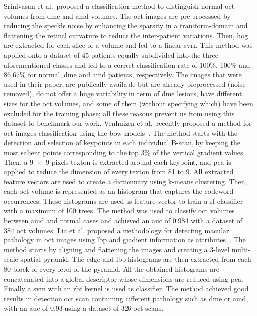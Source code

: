 Srinivasan et al.\,\cite{srinivasan2014fully} proposed a classification method to distinguish normal \gls{oct} volumes from \gls{dme} and \gls{amd} volumes.
The \gls{oct} images are pre-processed by reducing the speckle noise by enhancing the sparsity in a transform-domain and flattening the retinal curvature to reduce the inter-patient variations.
Then, \gls{hog} are extracted for each slice of a volume and fed to a linear \gls{svm}.
This method was applied onto a dataset of 45 patients equally subdivided into the three aforementioned classes and led to a correct classification rate of 100\%, 100\% and 86.67\% for normal, \gls{dme} and \gls{amd} patients, respectively.
The images that were used in their paper, are publically available but are already preprocessed (noise removed), do not offer a huge variability in term of \gls{dme} lesions, have different sizes for the \gls{oct} volumes, and some of them (without specifying which) have been excluded for the training phase; all these reasons prevent us from using this dataset to benchmark our work.
Venhuizen et al.\,\cite{venhuizen2015automated} recently proposed a method for \gls{oct} images classification using the \gls{bow} models~\cite{Sivic2003}.
The method starts with the detection and selection of keypoints in each individual B-scan, by keeping the most salient points corresponding to the top 3\% of the vertical gradient values.
Then, a 9~$\times$~9 pixels texton is extracted around each keypoint, and \gls{pca} is applied to reduce the dimension of every texton from 81 to 9. 
All extracted feature vectors are used to create a dictionnary using k-means clustering.
Then, each \gls{oct} volume is represented as an histogram that captures the codeword occurrences.
These histograms are used as feature vector to train a \gls{rf} classifier with a maximum of 100 trees.
The method was used to classify \gls{oct} volumes between \gls{amd} and normal cases and achieved an \gls{auc} of 0.984 with a dataset of 384 \gls{oct} volumes.
Liu et al. proposed a methodology for detecting macular pathology in \gls{oct} images using \gls{lbp} and gradient information as attributes~\cite{liu2011automated}.
The method starts by aligning and flattening the images and creating a 3-level multi-scale spatial pyramid.
The edge and \gls{lbp} histograms are then extracted from each 80 block of every level of the pyramid.
All the obtained histograms are concatenated into a global descriptor whose dimensions are reduced using \gls{pca}.
Finally a \gls{svm} with an \gls{rbf} kernel is used as classifier.
The method achieved good results in detection \gls{oct} scan containing different pathology such as \gls{dme} or \gls{amd}, with an \gls{auc} of 0.93 using a dataset of 326 \gls{oct} scans.
